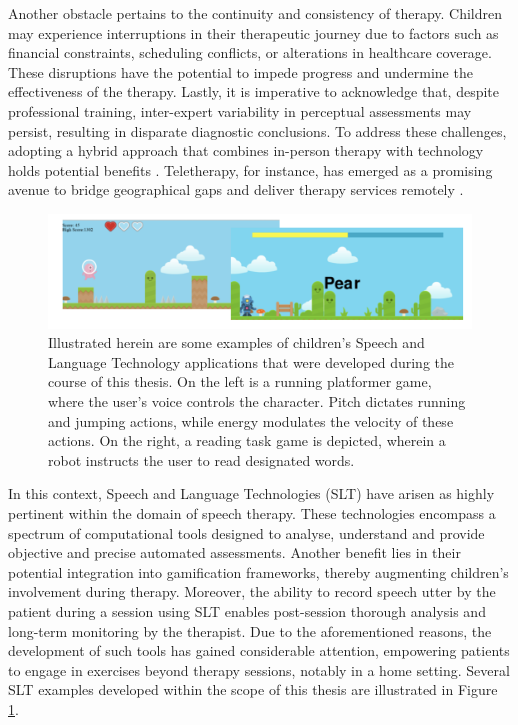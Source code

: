 Another obstacle pertains to the continuity and consistency of therapy. Children may experience interruptions in their therapeutic journey due to factors such as financial constraints, scheduling conflicts, or alterations in healthcare coverage. These disruptions have the potential to impede progress and undermine the effectiveness of the therapy. Lastly, it is imperative to acknowledge that, despite professional training, inter-expert variability in perceptual assessments may persist, resulting in disparate diagnostic conclusions. To address these challenges, adopting a hybrid approach that combines in-person therapy with technology holds potential benefits \cite{hilty2015new,barnett2011utilizing}. Teletherapy, for instance, has emerged as a promising avenue to bridge geographical gaps and deliver therapy services remotely \cite{hughes2019increasing}.


\begin{figure}
    \centering
    \includegraphics[width=1\textwidth]{imgs/exampleSLT.png}
    \caption{Illustrated herein are some examples of children's Speech and Language Technology applications that were developed during the course of this thesis. On the left is a running platformer game, where the user's voice controls the character. Pitch dictates running and jumping actions, while energy modulates the velocity of these actions. On the right, a reading task game is depicted, wherein a robot instructs the user to read designated words.}
    \label{fig:exSLT}

\end{figure}

In this context, Speech and Language Technologies (SLT) have arisen as highly pertinent within the domain of speech therapy. These technologies encompass a spectrum of computational tools designed to analyse, understand and provide objective and precise automated assessments. Another benefit lies in their potential integration into gamification frameworks, thereby augmenting children's involvement during therapy. Moreover, the ability to record speech utter by the patient during a session using SLT enables post-session thorough analysis and long-term monitoring by the therapist. Due to the aforementioned reasons, the development of such tools has gained considerable attention, empowering patients to engage in exercises beyond therapy sessions, notably in a home setting. Several SLT examples developed within the scope of this thesis are illustrated in Figure \ref{fig:exSLT}.

